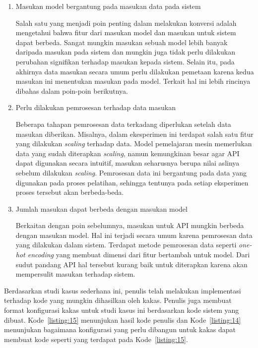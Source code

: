 \begin{enumerate}
	\item Masukan model bergantung pada masukan data pada sistem 
	
	Salah satu yang menjadi poin penting dalam melakukan konversi adalah mengetahui bahwa fitur dari masukan model dan masukan untuk sistem dapat berbeda.
	Sangat mungkin masukan sebuah model lebih banyak daripada masukan pada sistem dan mungkin juga tidak perlu dilakukan perubahan signifikan terhadap masukan kepada sistem.
	Selain itu, pada akhirnya data masukan secara umum perlu dilakukan pemetaan karena kedua masukan ini menentukan masukan pada model.
	Terkait hal ini lebih rincinya dibahas dalam poin-poin berikutnya.

	\item Perlu dilakukan pemrosesan terhadap data masukan
	
	Beberapa tahapan pemrosesan data terkadang diperlukan setelah data masukan diberikan.
	Misalnya, dalam ekesperimen ini terdapat salah satu fitur yang dilakukan \textit{scaling} terhadap data.
	Model pemelajaran mesin memerlukan data yang sudah diterapkan \textit{scaling}, namun kemungkinan besar agar API dapat digunakan secara intuitif, masukan seharusnya berupa nilai aslinya sebelum dilakukan \textit{scaling}.
	Pemrosesan data ini bergantung pada data yang digunakan pada proses pelatihan, sehingga tentunya pada setiap eksperimen proses tersebut akan berbeda-beda.
	
	\item Jumlah masukan dapat berbeda dengan masukan model
	
	Berkaitan dengan poin sebelumnya, masukan untuk API mungkin berbeda dengan masukan model.
	Hal ini terjadi secara umum karena pemrosesan data yang dilakukan dalam sistem.
	Terdapat metode pemrosesan data seperti \textit{one-hot encoding} yang membuat dimensi dari fitur bertambah untuk model.
	Dari sudut pandang API hal tersebut kurang baik untuk diterapkan karena akan mempersulit masukan terhadap sistem.
\end{enumerate}

Berdasarkan studi kasus sederhana ini, penulis telah melakukan implementasi terhadap kode yang mungkin dihasilkan oleh kakas.
Penulis juga membuat format konfigurasi kakas untuk studi kasus ini berdasarkan kode sistem yang dibuat.
Kode~\ref{listing:15} menunjukan hasil kode penulis dan Kode~\ref{listing:14} menunjukan bagaimana konfigurasi yang perlu dibangun untuk kakas dapat membuat kode seperti yang terdapat pada Kode~\ref{listing:15}.

